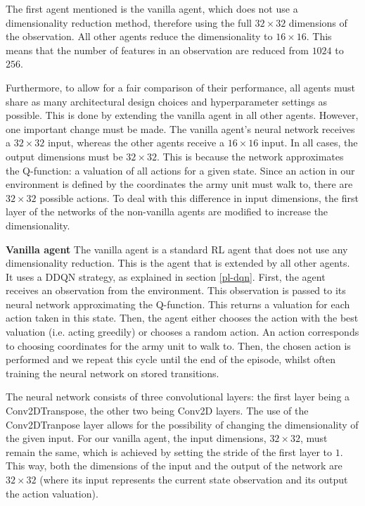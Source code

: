 The first agent mentioned is the vanilla agent, which does not use a dimensionality reduction method, therefore using the full $32 \times 32$ dimensions of the observation. All other agents reduce the dimensionality to $16 \times 16$. This means that the number of features in an observation are reduced from $1024$ to $256$.

Furthermore, to allow for a fair comparison of their performance, all agents must share as many architectural design choices and hyperparameter settings as possible. This is done by extending the vanilla agent in all other agents. However, one important change must be made. The vanilla agent's neural network receives a $32 \times 32$ input, whereas the other agents receive a $16 \times 16$ input. In all cases, the output dimensions must be $32 \times 32$. This is because the network approximates the Q-function: a valuation of all actions for a given state. Since an action in our environment is defined by the coordinates the army unit must walk to, there are $32 \times 32$ possible actions. To deal with this difference in input dimensions, the first layer of the networks of the non-vanilla agents are modified to increase the dimensionality.\newline

\noindent \textbf{Vanilla agent}\newline
\noindent The vanilla agent is a standard RL agent that does not use any dimensionality reduction. This is the agent that is extended by all other agents. It uses a DDQN strategy, as explained in section \ref{pl-dqn}. %
First, the agent receives an observation from the environment. This observation is passed to its neural network approximating the Q-function. This returns a valuation for each action taken in this state. Then, the agent either chooses the action with the best valuation (i.e. acting greedily) or chooses a random action. An action corresponds to choosing coordinates for the army unit to walk to. Then, the chosen action is performed and we repeat this cycle until the end of the episode, whilst often training the neural network on stored transitions.

The neural network consists of three convolutional layers: the first layer being a Conv2DTranspose, the other two being Conv2D layers. The use of the Conv2DTranpose layer allows for the possibility of changing the dimensionality of the given input. For our vanilla agent, the input dimensions, $32 \times 32$, must remain the same, which is achieved by setting the stride of the first layer to $1$. This way, both the dimensions of the input and the output of the network are $32 \times 32$ (where its input represents the current state observation and its output the action valuation).\newline

